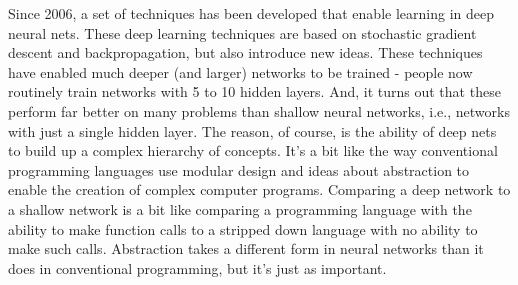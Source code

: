 Since 2006, a set of techniques has been developed that enable learning in deep neural nets. These deep learning techniques are based on stochastic gradient descent and backpropagation, but also introduce new ideas. These techniques have enabled much deeper (and larger) networks to be trained - people now routinely train networks with 5 to 10 hidden layers. And, it turns out that these perform far better on many problems than shallow neural networks, i.e., networks with just a single hidden layer. The reason, of course, is the ability of deep nets to build up a complex hierarchy of concepts. It's a bit like the way conventional programming languages use modular design and ideas about abstraction to enable the creation of complex computer programs. Comparing a deep network to a shallow network is a bit like comparing a programming language with the ability to make function calls to a stripped down language with no ability to make such calls. Abstraction takes a different form in neural networks than it does in conventional programming, but it's just as important.

